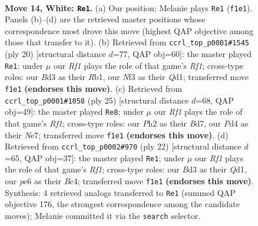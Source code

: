 \documentclass[11pt]{article}
\begin{document}
\clearpage

\begin{figure}[p]\centering
\begin{subfigure}{0.46\textwidth}\centering
\resizebox{\linewidth}{!}{%
\newchessgame
\chessboard[
  setfen={rn1br1k1/ppqb1ppp/4pn2/2Pp4/N2P4/3B1N2/PP1B1PPP/2RQ1RK1 w - - 13 14},
  showmover=false,
  pgfstyle=straightmove, color=movearrow, markmove={f1-e1}
]}
\caption{}
\end{subfigure}\hfill
\begin{subfigure}{0.46\textwidth}\centering
\resizebox{\linewidth}{!}{%
\newchessgame
\chessboard[
  setfen={rnb2rk1/pp2ppbp/2pq1np1/8/P1BP4/2N2N2/2P2PPP/1RBQ1RK1 w - - 4 11},
  showmover=false,
  pgfstyle=straightmove, color=movearrow, markmove={f1-e1}
]}
\caption{}
\end{subfigure}
\\[4pt]
\begin{subfigure}{0.46\textwidth}\centering
\resizebox{\linewidth}{!}{%
\newchessgame
\chessboard[
  setfen={r2q1rk1/1ppbnpb1/p1np2pp/8/4P3/2PQBN2/PPBN1PPP/R3R1K1 b - - 3 13},
  showmover=false,
  pgfstyle=straightmove, color=movearrow, markmove={f8-e8}
]}
\caption{}
\end{subfigure}\hfill
\begin{subfigure}{0.46\textwidth}\centering
\resizebox{\linewidth}{!}{%
\newchessgame
\chessboard[
  setfen={r1b2rk1/p2n1ppp/1p2pn2/q7/1bBP4/2N2N2/PP1B1PPP/R2Q1RK1 w - - 0 12},
  showmover=false,
  pgfstyle=straightmove, color=movearrow, markmove={f1-e1}
]}
\caption{}
\end{subfigure}
\caption{\textbf{Move 14, White: \texttt{Re1}.} (a) Our position; Melanie plays \texttt{Re1} (\texttt{f1e1}). Panels (b)--(d) are the retrieved master positions whose correspondence most drove this move (highest QAP objective among those that transfer to it). (b) Retrieved from \texttt{ccrl\_top\_p0001\#1545} (ply 20) [structural distance $d$=77, QAP obj=60]: the master played \texttt{Re1}; under $\mu$ our \emph{Rf1} plays the role of that game's \emph{Rf1}; cross-type roles: our \emph{B}d3 as their \emph{R}b1, our \emph{N}f3 as their \emph{Q}d1; transferred move \texttt{f1e1} \textbf{(endorses this move)}. (c) Retrieved from \texttt{ccrl\_top\_p0001\#1058} (ply 25) [structural distance $d$=68, QAP obj=49]: the master played \texttt{Re8}; under $\mu$ our \emph{Rf1} plays the role of that game's \emph{Rf1}; cross-type roles: our \emph{P}h2 as their \emph{B}d7, our \emph{P}d4 as their \emph{N}e7; transferred move \texttt{f1e1} \textbf{(endorses this move)}. (d) Retrieved from \texttt{ccrl\_top\_p0002\#970} (ply 22) [structural distance $d$=65, QAP obj=37]: the master played \texttt{Re1}; under $\mu$ our \emph{Rf1} plays the role of that game's \emph{Rf1}; cross-type roles: our \emph{B}d3 as their \emph{Q}d1, our \emph{p}e6 as their \emph{B}c4; transferred move \texttt{f1e1} \textbf{(endorses this move)}. Synthesis: 4 retrieved analogs transferred to \texttt{Re1} (summed QAP objective 176, the strongest correspondence among the candidate moves); Melanie committed it via the \texttt{search} selector.}
\label{fig:thought-m26}
\end{figure}
\end{document}
